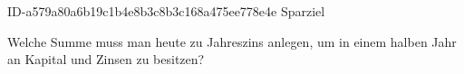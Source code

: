 \begin{exercise}
      {ID-a579a80a6b19c1b4e8b3c8b3c168a475ee778e4e}
      {Sparziel}
  \ifproblem\problem\par
    Welche Summe muss man heute zu  Jahreszins anlegen, um in einem
    halben Jahr an Kapital und Zinsen  zu besitzen?
  \fi
\end{exercise}
